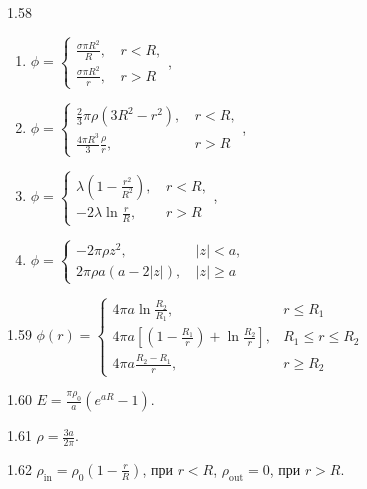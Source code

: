 \begin{Solution}{1.{58}}
	\begin{enumerate}[label=\alph*)]
		\item $\phi =
		      \begin{cases}
			  \frac{\sigma \pi R^2}{R}, \,    & r < R, \\
			  \frac{\sigma \pi R^2}{r}, \, & r > R
			  \end{cases}
			  $,
		\item $\phi =
			      \begin{cases}
				      \frac23 \pi \rho (3R^2 - r^2), \,    & r < R, \\
				      \frac{4\pi R^3}{3}\frac{\rho}{r}, \, & r > R
			      \end{cases}
		      $,
		\item $\phi =
			      \begin{cases}
				      \lambda \left(1- \frac{r^2}{R^2} \right) ,\, & r < R, \\
				      -2\lambda\ln\frac{r}{R}, \,                  & r > R
			      \end{cases}
		      $,
		\item $\phi =
			      \begin{cases}
				      -2\pi\rho z^2, \,                      & \left| z\right| < a,  \\
				      2\pi\rho a (a - 2\left| z\right| ), \, & \left| z\right| \ge a
			      \end{cases}
		      $
	\end{enumerate}
\end{Solution}
\begin{Solution}{1.{59}}
	$
		\phi(r) =
		\begin{cases}
			4\pi a\ln\frac{R_2}{R_1},                                                  & r \le R_1         \\
			4\pi a \left[ \left( 1- \frac{R_1}{r}\right)  + \ln\frac{R_2}{r} \right] , & R_1 \le r \le R_2 \\
			4\pi a \frac{R_2 - R_1}{r},                                                & r \ge R_2
		\end{cases}
	$
\end{Solution}
\begin{Solution}{1.{60}}
	$E = \frac{\pi\rho_0}{a}(e^{aR} - 1)$.
\end{Solution}
\begin{Solution}{1.{61}}
	$\rho = \frac{3a}{2\pi}$.
\end{Solution}
\begin{Solution}{1.{62}}
	$\rho_{\mathrm{in}} = \rho_0\left( 1 - \frac{r}{R}\right)$, при $r <R$, $\rho_{\mathrm{out}} = 0$, при $r > R$.
\end{Solution}
